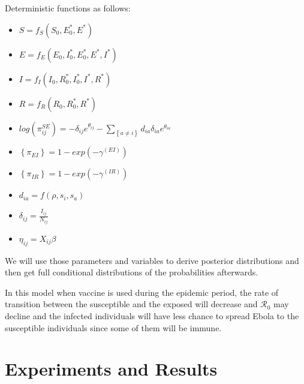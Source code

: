 \documentclass[11pt]{article}
\newcommand \mbreak {\\ \vspace{0.1in}}
\begin{document}
Deterministic functions as follows: 
\\
\begin{itemize}
\item $S = f_S(S_0, E^*_0, E^*)$ \\

\item $E = f_E(E_0, I^*_0, E^*_0, E^*, I^*)$ \\

\item $I = f_I(I_0, R^*_0, I^*_0, I^*, R^*)$ \\

\item $R = f_R(R_0, R^*_0, R^*)$ \\

\item $\displaystyle log(\pi^{SE}_{ij}) = -\delta_{ij}e^{\theta_{ij}} - \sum_{\left\{ a \ne i \right\}}d_{ia}\delta_{ia}e^{\theta_{ia}}$\\

\item $\left\{\pi_{EI}  \right\} = 1-exp({-\gamma^{(EI)}})$\\

\item $\left\{\pi_{IR}  \right\} = 1-exp({-\gamma^{(IR)}})$\\

\item $d_{ia} = f(\rho, s_i, s_a)$\\

\item $\delta_{ij} = \frac{I_{ij}}{N_{ij}}$ \\

\item $\eta_{ij} = X_{ij}\beta$\mbreak

\end{itemize}

We will use those parameters and variables to derive posterior distributions and then get full conditional distributions of the probabilities afterwards. 

In this model when vaccine is used during the epidemic period, the rate of transition between the susceptible and the exposed will decrease and $\mathcal{R}_0$ may decline and the infected individuals will have less chance to spread Ebola to the susceptible individuals since some of them will be immune. 

\section{Experiments and Results}
\end{document}
